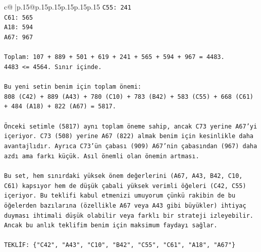 \documentclass{article}
\begin{document}
{\begin{supertabular}{c@{$\;$}|p{.15\linewidth}@{}p{.15\linewidth}p{.15\linewidth}p{.15\linewidth}p{.15\linewidth}p{.15\linewidth}}
{{{\texttt{C55: 241} \\
\texttt{C61: 565} \\
\texttt{A18: 594} \\
\texttt{A67: 967} \\
\\ 
\texttt{Toplam: 107 + 889 + 501 + 619 + 241 + 565 + 594 + 967 = 4483.} \\
\texttt{4483 <= 4564. Sınır içinde.} \\
\\ 
\texttt{Bu yeni setin benim için toplam önemi:} \\
\texttt{808 (C42) + 889 (A43) + 780 (C10) + 783 (B42) + 583 (C55) + 668 (C61) + 484 (A18) + 822 (A67) = 5817.} \\
\\ 
\texttt{Önceki setimle (5817) aynı toplam öneme sahip, ancak C73 yerine A67'yi içeriyor. C73 (508) yerine A67 (822) almak benim için kesinlikle daha avantajlıdır. Ayrıca C73'ün çabası (909) A67'nin çabasından (967) daha azdı ama farkı küçük. Asıl önemli olan önemin artması.} \\
\\ 
\texttt{Bu set, hem sınırdaki yüksek önem değerlerini (A67, A43, B42, C10, C61) kapsıyor hem de düşük çabali yüksek verimli öğeleri (C42, C55) içeriyor. Bu teklifi kabul etmenizi umuyorum çünkü rakibin de bu öğelerden bazılarına (özellikle A67 veya A43 gibi büyükler) ihtiyaç duyması ihtimali düşük olabilir veya farklı bir strateji izleyebilir. Ancak bu anlık teklifim benim için maksimum faydayı sağlar.} \\
\\ 
\texttt{TEKLİF: \{"C42", "A43", "C10", "B42", "C55", "C61", "A18", "A67"\}} \\
            }
        }
    }
     \\ \\


\end{supertabular}}
\end{document}
